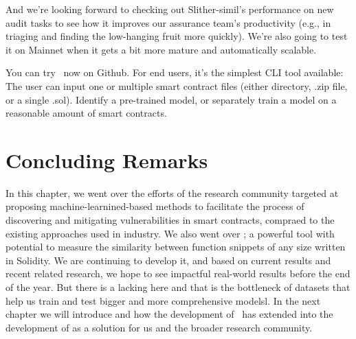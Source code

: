 And we're looking forward to checking out Slither-simil's performance on new audit tasks to see how
it improves our assurance team's productivity (e.g., in triaging and finding the low-hanging fruit more quickly).
We're also going to test it on Mainnet when it gets a bit more mature and automatically scalable.

You can try \slithersimil~now on Github.
For end users, it's the simplest CLI tool available:
The user can input one or multiple smart contract files (either directory, .zip file, or a single .sol).
Identify a pre-trained model, or separately train a model on a reasonable amount of smart contracts.

\section{Concluding Remarks}

In this chapter, we went over the efforts of the research community targeted at proposing machine-learnined-based methods to facilitate the process of discovering and mitigating vulnerabilities in smart contracts, compraed to the existing approaches used in industry.
We also went over \slithersimil; a powerful tool with potential to measure the similarity between function snippets of any size written in Solidity.
We are continuing to develop it, and based on current results and recent related research, we hope to see impactful real-world results before the end of the year.
But there is a lacking here and that is the bottleneck of datasets that help us train and test bigger and more comprehensive modelsl.
In the next chapter we will introduce \etherbase and how the development of \slithersimil~has extended into the development of \etherbase as a solution for us and the broader research community.